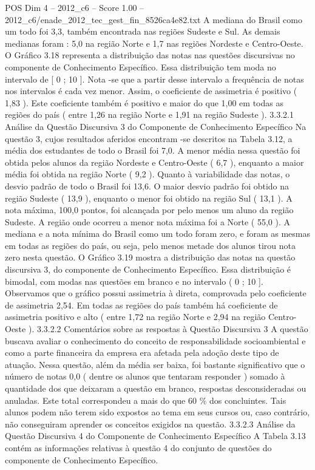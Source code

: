 \begin{textsample}{POS Dim 4 – 2012\_c6 – Score 1.00 – 2012\_c6/enade\_2012\_tec\_gest\_fin\_8526ca4e82.txt}
A mediana do Brasil como um todo foi 3,3, também encontrada nas regiões Sudeste e Sul.
As demais medianas foram : 5,0 na região Norte e 1,7 nas regiões Nordeste e Centro-Oeste.
O Gráfico 3.18 representa a distribuição das notas nas questões discursivas no componente de Conhecimento Específico.
Essa distribuição tem moda no intervalo de [ 0 ; 10 ].
Nota -se que a partir desse intervalo a frequência de notas nos intervalos é cada vez menor.
Assim, o coeficiente de assimetria é positivo ( 1,83 ).
Este coeficiente também é positivo e maior do que 1,00 em todas as regiões do país ( entre 1,26 na região Norte e 1,91 na região Sudeste ). 3.3.2.1 Análise da Questão Discursiva 3 do Componente de Conhecimento Específico Na questão 3, cujos resultados aferidos encontram -se descritos na Tabela 3.12, a média dos estudantes de todo o Brasil foi 7,0.
A menor média nessa questão foi obtida pelos alunos da região Nordeste e Centro-Oeste ( 6,7 ), enquanto a maior média foi obtida na região Norte ( 9,2 ).
Quanto à variabilidade das notas, o desvio padrão de todo o Brasil foi 13,6.
O maior desvio padrão foi obtido na região Sudeste ( 13,9 ), enquanto o menor foi obtido na região Sul ( 13,1 ).
A nota máxima, 100,0 pontos, foi alcançada por pelo menos um aluno da região Sudeste.
A região onde ocorreu a menor nota máxima foi a Norte ( 55,0 ).
A mediana e a nota mínima do Brasil como um todo foram zero, e foram as mesmas em todas as regiões do país, ou seja, pelo menos metade dos alunos tirou nota zero nesta questão.
O Gráfico 3.19 mostra a distribuição das notas na questão discursiva 3, do componente de Conhecimento Específico.
Essa distribuição é bimodal, com modas nas questões em branco e no intervalo ( 0 ; 10 ].
Observamos que o gráfico possui assimetria à direta, comprovada pelo coeficiente de assimetria 2,54.
Em todas as regiões do país também há coeficiente de assimetria positivo e alto ( entre 1,72 na região Norte e 2,94 na região Centro-Oeste ). 3.3.2.2 Comentários sobre as respostas à Questão Discursiva 3 A questão buscava avaliar o conhecimento do conceito de responsabilidade socioambiental e como a parte financeira da empresa era afetada pela adoção deste tipo de atuação.
Nessa questão, além da média ser baixa, foi bastante significativo que o número de notas 0,0 ( dentre os alunos que tentaram responder ) somado à quantidade dos que deixaram a questão em branco, respostas desconsideradas ou anuladas.
Este total correspondeu a mais do que 60 \% dos concluintes.
Tais alunos podem não terem sido expostos ao tema em seus cursos ou, caso contrário, não conseguiram aprender os conceitos exigidos na questão. 3.3.2.3 Análise da Questão Discursiva 4 do Componente de Conhecimento Específico A Tabela 3.13 contém as informações relativas à questão 4 do conjunto de questões do componente de Conhecimento Específico.

\end{textsample}
